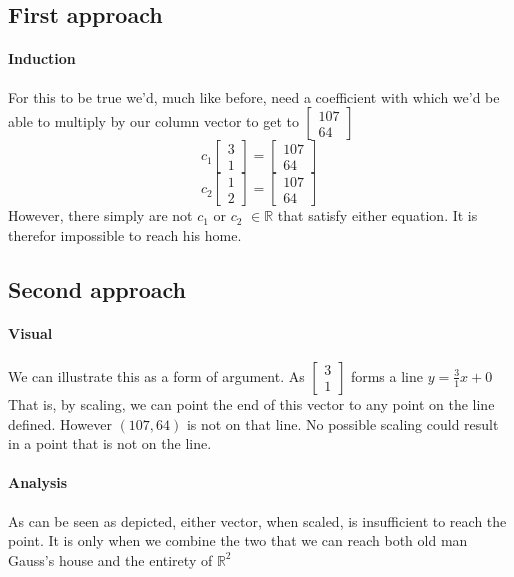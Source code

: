 \documentclass{article}
\begin{document}
    \subsection{First approach}
    \paragraph{Induction}
        For this to be true we'd, much like before, need a coefficient with which
        we'd be able to multiply by our column vector to get to $\begin{bmatrix}107 \\ 64\end{bmatrix}$
        \[{c_1}\begin{bmatrix}3 \\ 1\end{bmatrix} = \begin{bmatrix}107 \\ 64\end{bmatrix}\]
        \[{c_2}\begin{bmatrix}1 \\ 2\end{bmatrix} = \begin{bmatrix}107 \\ 64\end{bmatrix}\]
        However, there simply are not $c_1$ or $c_2$ $\in{\mathbb{R}}$ that satisfy either equation.
        It is therefor impossible to reach his home.
    \subsection{Second approach}
    \paragraph{Visual}
        We can illustrate this as a form of argument. As $\begin{bmatrix}3 \\ 1\end{bmatrix}$ forms a line
        $y=\frac{3}{1}x+0$ That is, by scaling, we can point the end of this vector
        to any point on the line defined. However $(107, 64)$ is not on that line. No possible scaling
        could result in a point that is not on the line.
        \begin{center}
        \end{center}
    \paragraph{Analysis}
    As can be seen as depicted, either vector, when scaled, is insufficient
    to reach the point. It is only when we combine the two that we can reach
    both old man Gauss's house and the entirety of $\mathbb{R}^2$
\end{document}
